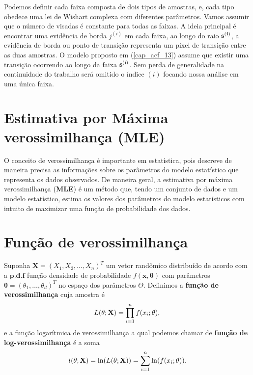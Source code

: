 Podemos definir cada faixa composta de dois tipos de amostras, e, cada tipo obedece uma lei de Wishart complexa com diferentes parâmetros. Vamos assumir que o número de visadas é constante para todas as faixas. A ideia principal é encontrar uma evidência de borda $j^{(i)}$ em cada faixa, ao longo do raio ${\bf s^{(i)}}$, a evidência de borda ou ponto de transição representa um pixel de transição entre as duas amostras. O modelo proposto em (\ref{cap_acf_13}) assume que existir uma transição ocorrendo ao longo da faixa $\bf s^{(i)}$. Sem perda de generalidade na continuidade do trabalho será omitido o índice $(i)$ focando nossa análise em uma única faixa.
\section{Estimativa por Máxima verossimilhança (\textbf{MLE})}\label{cap_acf_sec3}

O conceito de verossimilhança é importante em estatística, pois descreve de maneira precisa as informações sobre os parâmetros do modelo estatístico que representa os dados observados. De maneira geral, a estimativa por máxima verossimilhança (\textbf{MLE}) é um método que, tendo um conjunto de dados e um modelo estatístico, estima os valores dos parâmetros do modelo estatísticos com intuito de maximizar uma função de probabilidade dos dados. 

\section{Função de verossimilhança}

Suponha $\mathbf{X}=(X_1,X_2,\dots,X_n)^T$ um vetor randômico distribuído de acordo com a $\mathbf{p.d.f}$ função densidade de probabilidade $f(\mathbf{x},\mathbf{\theta})$ com parâmetros $\mathbf{\theta}=(\theta_1,\dots,\theta_d)^T$ no espaço dos parâmetros $\Theta$. Definimos  a \textbf{função de verossimilhança} cuja amostra é 
\begin{equation}\label{cap_acf_14}
    L(\theta;\mathbf{X}) = \prod_{i=1}^{n}f(x_i;\theta), \\
\end{equation}
e a função logarítmica de verossimilhança a qual podemos chamar de  \textbf{função de log-verossimilhança} é a soma
\begin{equation}\label{cap_acf_15}
	l(\theta;\mathbf{X})= \ln(L(\theta;\mathbf{X})) = \sum_{i=1}^{n}\ln(f(x_i;\theta)). \\
\end{equation}

